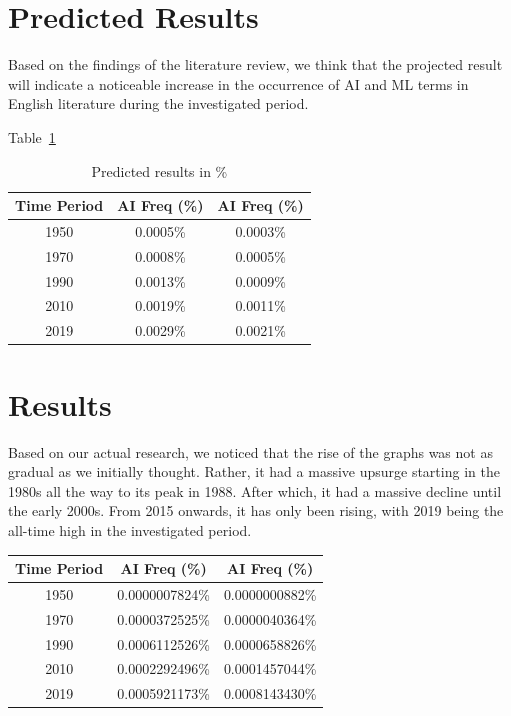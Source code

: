 \documentclass[11pt]{article}
\begin{document}
{\section{Predicted Results}

Based on the findings of the literature review, we think that the projected result will indicate a noticeable increase in the occurrence of AI and ML terms in English literature during the investigated period.

Table~\ref{tbl:results} 


\begin{table}[hbtp]\centering
\begin{tabular}{|ccc|}
\hline
Time Period & AI Freq (\%) & AI Freq (\%)\\
\hline
1950 & 0.0005\% & 0.0003\%\\
1970 & 0.0008\% & 0.0005\%\\
1990 & 0.0013\% & 0.0009\%\\
2010 & 0.0019\% & 0.0011\%\\
2019 & 0.0029\% & 0.0021\%\\

\hline
\end{tabular}
\caption{Predicted results in \%}
\label{tbl:results}
\end{table}

\section{Results} 

Based on our actual research, we noticed that the rise of the graphs was not as gradual as we initially thought. Rather, it had a massive upsurge starting in the 1980s all the way to its peak in 1988. After which, it had a massive decline until the early 2000s. From 2015 onwards, it has only been rising, with 2019 being the all-time high in the investigated period.

\begin{table}[hbtp]\centering
\begin{tabular}{|ccc|}
\hline
Time Period & AI Freq (\%) & AI Freq (\%)\\
\hline
1950 & 0.0000007824\% & 0.0000000882\%\\
1970 & 0.0000372525\% & 0.0000040364\%\\
1990 & 0.0006112526\% & 0.0000658826\%\\
2010 & 0.0002292496\% & 0.0001457044\%\\
2019 & 0.0005921173\% & 0.0008143430\%\\


\end{tabular}
\end{table}}
\end{document}
